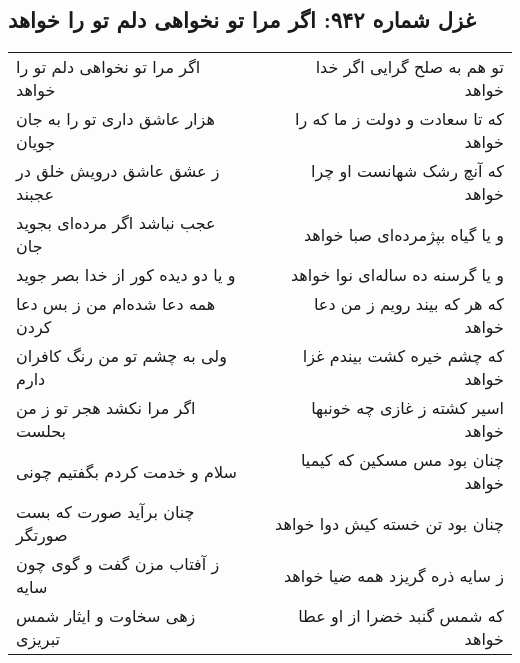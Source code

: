 \begin{center}
\section*{غزل شماره ۹۴۲: اگر مرا تو نخواهی دلم تو را خواهد}
\label{sec:0942}
\begin{longtable}{l p{0.5cm} r}
اگر مرا تو نخواهی دلم تو را خواهد
&&
تو هم به صلح گرایی اگر خدا خواهد
\\
هزار عاشق داری تو را به جان جویان
&&
که تا سعادت و دولت ز ما که را خواهد
\\
ز عشق عاشق درویش خلق در عجبند
&&
که آنچ رشک شهانست او چرا خواهد
\\
عجب نباشد اگر مرده‌ای بجوید جان
&&
و یا گیاه بپژمرده‌ای صبا خواهد
\\
و یا دو دیده کور از خدا بصر جوید
&&
و یا گرسنه ده ساله‌ای نوا خواهد
\\
همه دعا شده‌ام من ز بس دعا کردن
&&
که هر که بیند رویم ز من دعا خواهد
\\
ولی به چشم تو من رنگ کافران دارم
&&
که چشم خیره کشت بیندم غزا خواهد
\\
اگر مرا نکشد هجر تو ز من بحلست
&&
اسیر کشته ز غازی چه خونبها خواهد
\\
سلام و خدمت کردم بگفتیم چونی
&&
چنان بود مس مسکین که کیمیا خواهد
\\
چنان برآید صورت که بست صورتگر
&&
چنان بود تن خسته کیش دوا خواهد
\\
ز آفتاب مزن گفت و گوی چون سایه
&&
ز سایه ذره گریزد همه ضیا خواهد
\\
زهی سخاوت و ایثار شمس تبریزی
&&
که شمس گنبد خضرا از او عطا خواهد
\\
\end{longtable}
\end{center}

